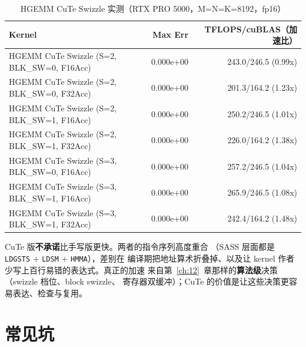 \begin{table}[H]
\centering
\caption{HGEMM CuTe Swizzle 实测（RTX PRO 5000，M=N=K=8192，fp16）}
\label{tab:ch24-perf}
\footnotesize
\setlength{\tabcolsep}{4pt}
\begin{tabular}{lrr}
\toprule
Kernel & Max Err & TFLOPS/cuBLAS（加速比） \\
\midrule
HGEMM CuTe Swizzle (S=2, BLK\_SW=0, F16Acc) & 0.000e+00 & 243.0/246.5 (0.99x) \\
HGEMM CuTe Swizzle (S=2, BLK\_SW=0, F32Acc) & 0.000e+00 & 201.3/164.2 (1.23x) \\
HGEMM CuTe Swizzle (S=2, BLK\_SW=1, F16Acc) & 0.000e+00 & 250.2/246.5 (1.01x) \\
HGEMM CuTe Swizzle (S=2, BLK\_SW=1, F32Acc) & 0.000e+00 & 226.0/164.2 (1.38x) \\
HGEMM CuTe Swizzle (S=3, BLK\_SW=0, F16Acc) & 0.000e+00 & 257.2/246.5 (1.04x) \\
HGEMM CuTe Swizzle (S=3, BLK\_SW=1, F16Acc) & 0.000e+00 & 265.9/246.5 (1.08x) \\
HGEMM CuTe Swizzle (S=3, BLK\_SW=1, F32Acc) & 0.000e+00 & 242.4/164.2 (1.48x) \\
\bottomrule
\end{tabular}
\end{table}

CuTe 版\textbf{不承诺}比手写版更快。两者的指令序列高度重合
（SASS 层面都是 \texttt{LDGSTS} $+$ \texttt{LDSM} $+$ \texttt{HMMA}），差别在
编译期把地址算术折叠掉、以及让 kernel 作者少写上百行易错的表达式。真正的加速
来自第~\ref{ch:12}~章那样的\textbf{算法级}决策（swizzle 档位、block swizzle、
寄存器双缓冲）；CuTe 的价值是让这些决策更容易表达、检查与复用。

\section{常见坑}

